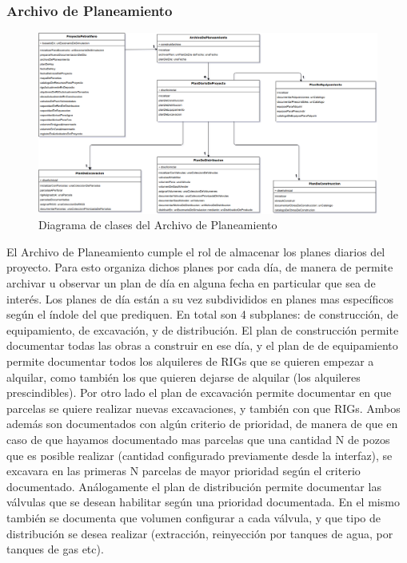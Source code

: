 \documentclass[10pt,a4paper]{article}
\begin{document}
\subsubsection{Archivo de Planeamiento}

\begin{figure}[H]
\centerline{\includegraphics[scale=0.39]{images/DiagramaDeClases_ArchivoDePlaneamiento.png}}
\caption{Diagrama de clases del Archivo de Planeamiento}
\end{figure}

El Archivo de Planeamiento cumple el rol de almacenar los planes diarios del proyecto. Para esto organiza dichos planes por cada día, de manera de permite archivar u observar un plan de día en alguna fecha en particular que sea de interés. Los planes de día están a su vez subdivididos en planes mas específicos según el índole del que prediquen. En total son 4 subplanes: de construcción, de equipamiento, de excavación, y de distribución. El plan de construcción permite documentar todas las obras a construir en ese día, y el plan de de equipamiento permite documentar todos los alquileres de RIGs que se quieren empezar a alquilar, como también los que quieren dejarse de alquilar (los alquileres prescindibles). Por otro lado el plan de excavación permite documentar en que parcelas se quiere realizar nuevas excavaciones, y también con que RIGs. Ambos además son documentados con algún criterio de prioridad, de manera de que en caso de que hayamos documentado mas parcelas que una cantidad N de pozos que es posible realizar (cantidad configurado previamente desde la interfaz), se excavara en las primeras N parcelas de mayor prioridad según el criterio documentado. Análogamente el plan de distribución permite documentar las válvulas que se desean habilitar según una prioridad documentada. En el mismo también se documenta que volumen configurar a cada válvula, y que tipo de distribución se desea realizar (extracción, reinyección por tanques de agua, por tanques de gas etc).  
\end{document}
